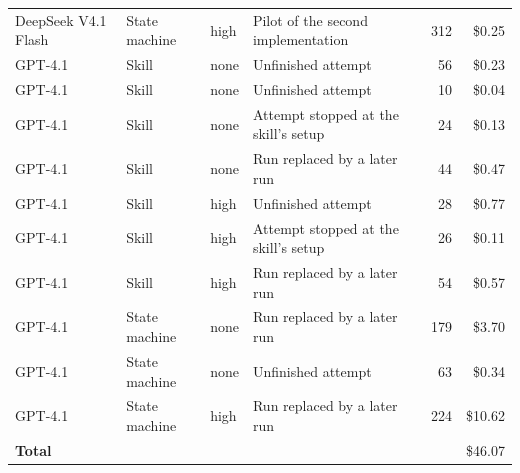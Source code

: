 {\begin{tabular}{@{}l l l l r r@{}}
DeepSeek V4.1 Flash & State machine & high & Pilot of the second implementation & 312 & \$0.25\\
GPT-4.1 & Skill & none & Unfinished attempt & 56 & \$0.23\\
GPT-4.1 & Skill & none & Unfinished attempt & 10 & \$0.04\\
GPT-4.1 & Skill & none & Attempt stopped at the skill's setup & 24 & \$0.13\\
GPT-4.1 & Skill & none & Run replaced by a later run & 44 & \$0.47\\
GPT-4.1 & Skill & high & Unfinished attempt & 28 & \$0.77\\
GPT-4.1 & Skill & high & Attempt stopped at the skill's setup & 26 & \$0.11\\
GPT-4.1 & Skill & high & Run replaced by a later run & 54 & \$0.57\\
GPT-4.1 & State machine & none & Run replaced by a later run & 179 & \$3.70\\
GPT-4.1 & State machine & none & Unfinished attempt & 63 & \$0.34\\
GPT-4.1 & State machine & high & Run replaced by a later run & 224 & \$10.62\\
\midrule\textbf{Total} & & & & & \$46.07\\
\bottomrule\end{tabular}}
